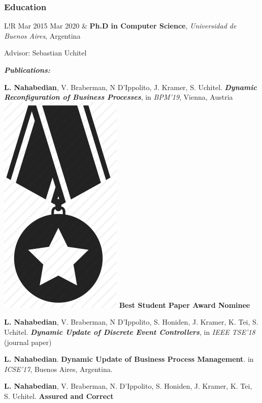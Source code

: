 \documentclass[10pt]{article}
\newcommand\VRule{\color{lightgray}\vrule width 0.5pt}
\begin{document}


\subsubsection*{Education}

\begin{tabular}{L!{\VRule}R}
	Mar 2015 Mar 2020 & \textbf{Ph.D in Computer Science}, 
	\textit{Universidad de Buenos Aires}, Argentina
	
	Advisor: Sebastian Uchitel
	
	\textit{\textbf{Publications:}}
	\begin{compactitem}
		\item \textbf{L. Nahabedian}, V. Braberman, N D'Ippolito, J. Kramer, S. 
		Uchitel.
		\textbf{\textit{Dynamic Reconfiguration of Business Processes}}, in 
		\textit{BPM'19}, Vienna, Austria 
		\includegraphics[scale=0.022]{../img/medal.png}
		\textbf{Best Student Paper Award Nominee}
		\item \textbf{L. Nahabedian}, V. Braberman, N D'Ippolito, S. Honiden, 
		J. 
		Kramer, K. Tei, 
		S. Uchitel.
		\textbf{\textit{Dynamic Update of Discrete Event Controllers}}, in 
		\textit{IEEE TSE'18} (journal paper)
		\item \textbf{L. Nahabedian}. \textbf{Dynamic Update of Business 
		Process
			Management}. in \textit{ICSE'17}, Buenos Aires, Argentina.
		\item \textbf{L. Nahabedian}, V. Braberman, N. D'Ippolito, S. Honiden, 
		J. Kramer, K. Tei, S. Uchitel. \textbf{Assured and Correct
}
\end{compactitem}
\end{tabular}
\end{document}
